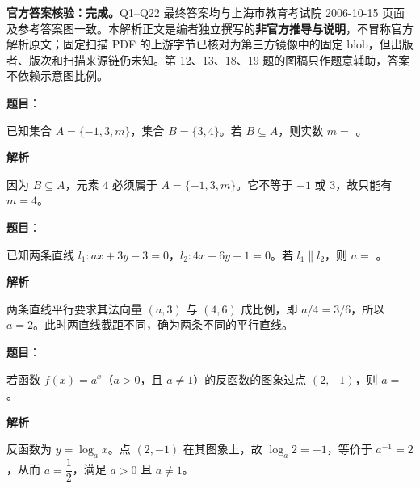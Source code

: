 

\begin{gktip}
\textbf{官方答案核验：完成。}Q1–Q22 最终答案均与上海市教育考试院 2006-10-15 页面及参考答案图一致。本解析正文是编者独立撰写的\textbf{非官方推导与说明}，不冒称官方解析原文；固定扫描 PDF 的上游字节已核对为第三方镜像中的固定 blob，但出版者、版次和扫描来源链仍未知。第 12、13、18、19 题的图稿只作题意辅助，答案不依赖示意图比例。
\end{gktip}

\begin{answer}

\textbf{题目}：

已知集合 $A=\{-1,3,m\}$，集合 $B=\{3,4\}$。若 $B\subseteq A$，则实数 $m=$ \gkblank{}。

\textbf{解析}

因为 $B\subseteq A$，元素 $4$ 必须属于 $A=\{-1,3,m\}$。它不等于 $-1$ 或 $3$，故只能有 $m=4$。


\end{answer}
\begin{answer}

\textbf{题目}：

已知两条直线 $l_1:ax+3y-3=0$，$l_2:4x+6y-1=0$。若 $l_1\parallel l_2$，则 $a=$ \gkblank{}。

\textbf{解析}

两条直线平行要求其法向量 $(a,3)$ 与 $(4,6)$ 成比例，即 $a/4=3/6$，所以 $a=2$。此时两直线截距不同，确为两条不同的平行直线。


\end{answer}
\begin{answer}

\textbf{题目}：

若函数 $f(x)=a^x$（$a>0$，且 $a\ne1$）的反函数的图象过点 $(2,-1)$，则 $a=$ \gkblank{}。

\textbf{解析}

反函数为 $y=\log_a x$。点 $(2,-1)$ 在其图象上，故 $\log_a2=-1$，等价于 $a^{-1}=2$，从而 $a=\dfrac12$，满足 $a>0$ 且 $a\ne1$。


\end{answer}
